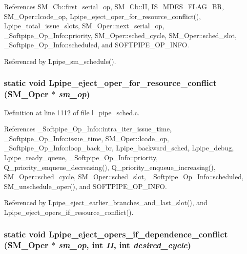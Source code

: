 References SM\_\-Cb::first\_\-serial\_\-op, SM\_\-Cb::II, IS\_\-MDES\_\-FLAG\_\-BR, SM\_\-Oper::lcode\_\-op, Lpipe\_\-eject\_\-oper\_\-for\_\-resource\_\-conflict(), Lpipe\_\-total\_\-issue\_\-slots, SM\_\-Oper::next\_\-serial\_\-op, \_\-Softpipe\_\-Op\_\-Info::priority, SM\_\-Oper::sched\_\-cycle, SM\_\-Oper::sched\_\-slot, \_\-Softpipe\_\-Op\_\-Info::scheduled, and SOFTPIPE\_\-OP\_\-INFO.

Referenced by Lpipe\_\-sm\_\-schedule().
\subsubsection{\setlength{\rightskip}{0pt plus 5cm}static void Lpipe\_\-eject\_\-oper\_\-for\_\-resource\_\-conflict (\bf{SM\_\-Oper} $\ast$ {\em sm\_\-op})\hspace{0.3cm}{\tt  [static]}}\label{l__pipe__sched_8c_001f35671967efcad3bd24f4fd7aeb13}




Definition at line 1112 of file l\_\-pipe\_\-sched.c.

References \_\-Softpipe\_\-Op\_\-Info::intra\_\-iter\_\-issue\_\-time, \_\-Softpipe\_\-Op\_\-Info::issue\_\-time, SM\_\-Oper::lcode\_\-op, \_\-Softpipe\_\-Op\_\-Info::loop\_\-back\_\-br, Lpipe\_\-backward\_\-sched, Lpipe\_\-debug, Lpipe\_\-ready\_\-queue, \_\-Softpipe\_\-Op\_\-Info::priority, Q\_\-priority\_\-enqueue\_\-decreasing(), Q\_\-priority\_\-enqueue\_\-increasing(), SM\_\-Oper::sched\_\-cycle, SM\_\-Oper::sched\_\-slot, \_\-Softpipe\_\-Op\_\-Info::scheduled, SM\_\-unschedule\_\-oper(), and SOFTPIPE\_\-OP\_\-INFO.

Referenced by Lpipe\_\-eject\_\-earlier\_\-branches\_\-and\_\-last\_\-slot(), and Lpipe\_\-eject\_\-opers\_\-if\_\-resource\_\-conflict().
\subsubsection{\setlength{\rightskip}{0pt plus 5cm}static void Lpipe\_\-eject\_\-opers\_\-if\_\-dependence\_\-conflict (\bf{SM\_\-Oper} $\ast$ {\em sm\_\-op}, int {\em II}, int {\em desired\_\-cycle})\hspace{0.3cm}{\tt  [static]}}\label{l__pipe__sched_8c_3958328b214031e4b78c8b9e33cb4a03}




